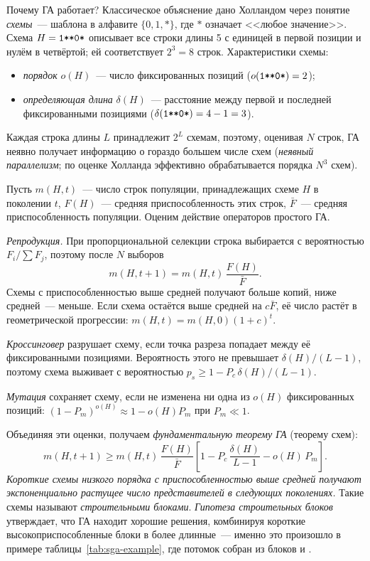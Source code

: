 Почему ГА работает? Классическое объяснение дано Холландом через понятие \emph{схемы}~---
шаблона в алфавите $\{0, 1, *\}$, где $*$ означает <<любое значение>>. Схема $H = \texttt{1**0*}$
описывает все строки длины 5 с единицей в первой позиции и нулём в четвёртой; ей соответствует $2^3 = 8$
строк. Характеристики схемы:
\begin{itemize}
\item \emph{порядок} $o(H)$~--- число фиксированных позиций ($o(\texttt{1**0*}) = 2$);
\item \emph{определяющая длина} $\delta(H)$~--- расстояние между первой и последней фиксированными
позициями ($\delta(\texttt{1**0*}) = 4 - 1 = 3$).
\end{itemize}
Каждая строка длины $L$ принадлежит $2^L$ схемам, поэтому, оценивая $N$ строк, ГА неявно получает
информацию о гораздо большем числе схем (\emph{неявный параллелизм}; по оценке Холланда
эффективно обрабатывается порядка $N^3$ схем).

Пусть $m(H, t)$~--- число строк популяции, принадлежащих схеме $H$ в поколении $t$, $F(H)$~--- средняя
приспособленность этих строк, $\bar F$~--- средняя приспособленность популяции. Оценим действие операторов
простого ГА.

\emph{Репродукция.} При пропорциональной селекции строка выбирается с вероятностью $F_i / \sum F_j$,
поэтому после $N$ выборов
\begin{equation}
m(H, t + 1) = m(H, t)\,\frac{F(H)}{\bar F}.
\end{equation}
Схемы с приспособленностью выше средней получают больше копий, ниже средней~--- меньше. Если схема
остаётся выше средней на $c\bar F$, её число растёт в геометрической прогрессии: $m(H, t) = m(H, 0)(1 + c)^t$.

\emph{Кроссинговер} разрушает схему, если точка разреза попадает между её фиксированными позициями.
Вероятность этого не превышает $\delta(H)/(L - 1)$, поэтому схема выживает с вероятностью
$p_s \ge 1 - P_c\,\delta(H)/(L - 1)$.

\emph{Мутация} сохраняет схему, если не изменена ни одна из $o(H)$ фиксированных позиций:
$(1 - P_m)^{o(H)} \approx 1 - o(H)P_m$ при $P_m \ll 1$.

Объединяя эти оценки, получаем \emph{фундаментальную теорему ГА} (теорему схем):
\begin{equation}
\label{eq:schema}
m(H, t + 1) \ge m(H, t)\,\frac{F(H)}{\bar F}\left[1 - P_c\,\frac{\delta(H)}{L - 1} - o(H)\,P_m\right].
\end{equation}
\emph{Короткие схемы низкого порядка с приспособленностью выше средней получают экспоненциально
растущее число представителей в следующих поколениях.} Такие схемы называют \emph{строительными
блоками}. \emph{Гипотеза строительных блоков} утверждает, что ГА находит хорошие решения, комбинируя
короткие высокоприспособленные блоки в более длинные~--- именно это произошло в примере
таблицы~\ref{tab:sga-example}, где потомок  собран из блоков  и .

